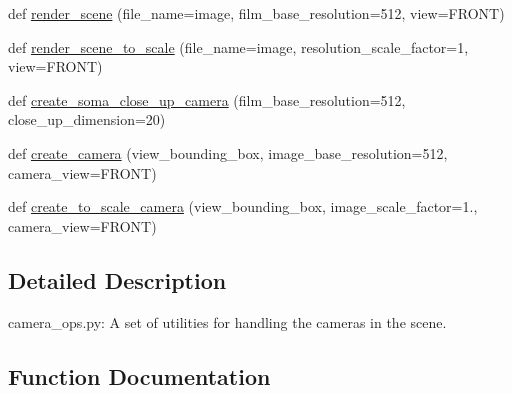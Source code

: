 \begin{DoxyCompactItemize}
\item 
def \hyperlink{namespacecamera__ops_a871d84c3a1b7e15beec9273ec11b8b85}{render\+\_\+scene} (file\+\_\+name=\textquotesingle{}image\textquotesingle{}, film\+\_\+base\+\_\+resolution=512, view=\textquotesingle{}F\+R\+O\+NT\textquotesingle{})
\item 
def \hyperlink{namespacecamera__ops_ad6f640adf5e176268db59c080ae0566c}{render\+\_\+scene\+\_\+to\+\_\+scale} (file\+\_\+name=\textquotesingle{}image\textquotesingle{}, resolution\+\_\+scale\+\_\+factor=1, view=\textquotesingle{}F\+R\+O\+NT\textquotesingle{})
\item 
def \hyperlink{namespacecamera__ops_a6db4df5adb2bcc60a9247517e5883ca0}{create\+\_\+soma\+\_\+close\+\_\+up\+\_\+camera} (film\+\_\+base\+\_\+resolution=512, close\+\_\+up\+\_\+dimension=20)
\item 
def \hyperlink{namespacecamera__ops_a799685fc481a4c88b31b4d05e4321a84}{create\+\_\+camera} (view\+\_\+bounding\+\_\+box, image\+\_\+base\+\_\+resolution=512, camera\+\_\+view=\textquotesingle{}F\+R\+O\+NT\textquotesingle{})
\item 
def \hyperlink{namespacecamera__ops_a52b2fdc4444cd3ca7680527dd05969f6}{create\+\_\+to\+\_\+scale\+\_\+camera} (view\+\_\+bounding\+\_\+box, image\+\_\+scale\+\_\+factor=1., camera\+\_\+view=\textquotesingle{}F\+R\+O\+NT\textquotesingle{})
\end{DoxyCompactItemize}


\subsection{Detailed Description}
\begin{DoxyVerb}camera_ops.py:
    A set of utilities for handling the cameras in the scene.
\end{DoxyVerb}
 

\subsection{Function Documentation}
